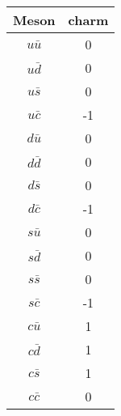 \begin{tabular}{cc}
\toprule
     Meson &  charm \\
\midrule
$u\bar{u}$ &      0 \\
$u\bar{d}$ &      0 \\
$u\bar{s}$ &      0 \\
$u\bar{c}$ &     -1 \\
$d\bar{u}$ &      0 \\
$d\bar{d}$ &      0 \\
$d\bar{s}$ &      0 \\
$d\bar{c}$ &     -1 \\
$s\bar{u}$ &      0 \\
$s\bar{d}$ &      0 \\
$s\bar{s}$ &      0 \\
$s\bar{c}$ &     -1 \\
$c\bar{u}$ &      1 \\
$c\bar{d}$ &      1 \\
$c\bar{s}$ &      1 \\
$c\bar{c}$ &      0 \\
\bottomrule
\end{tabular}
